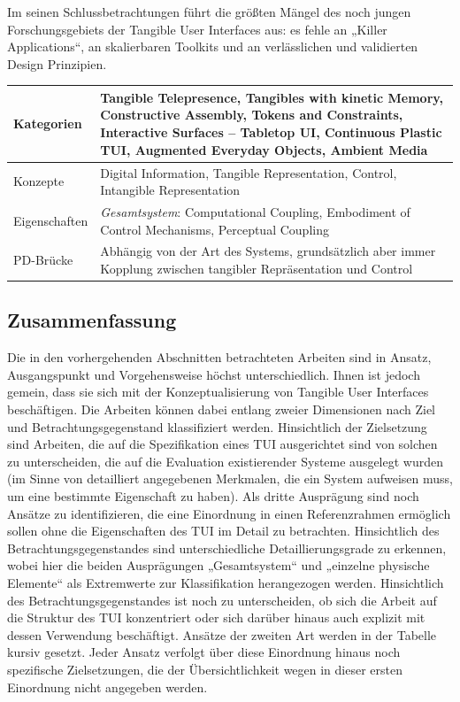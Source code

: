 Im seinen Schlussbetrachtungen führt \citeauthor{Ishii08} die größten Mängel des noch jungen Forschungsgebiets der Tangible User Interfaces aus: es fehle an „Killer Applications“, an skalierbaren Toolkits und an verlässlichen und validierten Design Prinzipien.
\\[1em]
\begin{tabular}{| p{3cm} | p{10cm} |}
  \hline
  Kategorien & Tangible Telepresence, Tangibles with kinetic Memory, Constructive Assembly, Tokens and Constraints, Interactive Surfaces -- Tabletop UI, Continuous Plastic TUI, Augmented Everyday Objects, Ambient Media \\ \hline
  Konzepte & Digital Information, Tangible Representation, Control, Intangible Representation \\ \hline
  Eigenschaften & \emph{Gesamtsystem}: Computational Coupling, Embodiment of Control Mechanisms, Perceptual Coupling \\ \hline
  PD-Brücke & Abhängig von der Art des Systems, grundsätzlich aber immer Kopplung zwischen tangibler Repräsentation und Control \\ \hline
\end{tabular} 


\subsection{Zusammenfassung} %
\label{sub:tui_konzepte_zusammenfassung}

Die in den vorhergehenden Abschnitten betrachteten Arbeiten sind in Ansatz, Ausgangspunkt und Vorgehensweise höchst unterschiedlich. Ihnen ist jedoch gemein, dass sie sich mit der Konzeptualisierung von Tangible User Interfaces beschäftigen. Die Arbeiten können dabei entlang zweier Dimensionen nach Ziel und Betrachtungsgegenstand klassifiziert werden. Hinsichtlich der Zielsetzung sind Arbeiten, die auf die Spezifikation eines \gls{TUI} ausgerichtet sind von solchen zu unterscheiden, die auf die Evaluation existierender Systeme ausgelegt wurden (im Sinne von detailliert angegebenen Merkmalen, die ein System aufweisen muss, um eine bestimmte Eigenschaft zu haben). Als dritte Ausprägung sind noch Ansätze zu identifizieren, die eine Einordnung in einen Referenzrahmen ermöglich sollen ohne die Eigenschaften des \gls{TUI} im Detail zu betrachten. Hinsichtlich des Betrachtungsgegenstandes sind unterschiedliche Detaillierungsgrade zu erkennen, wobei hier die beiden Ausprägungen „Gesamtsystem“ und „einzelne physische Elemente“ als Extremwerte zur Klassifikation herangezogen werden. Hinsichtlich des Betrachtungsgegenstandes ist noch zu unterscheiden, ob sich die Arbeit auf die Struktur des \gls{TUI} konzentriert oder sich darüber hinaus auch explizit mit dessen Verwendung beschäftigt. Ansätze der zweiten Art werden in der Tabelle kursiv gesetzt. Jeder Ansatz verfolgt über diese Einordnung hinaus noch spezifische Zielsetzungen, die der Übersichtlichkeit wegen in dieser ersten Einordnung nicht angegeben werden. 

